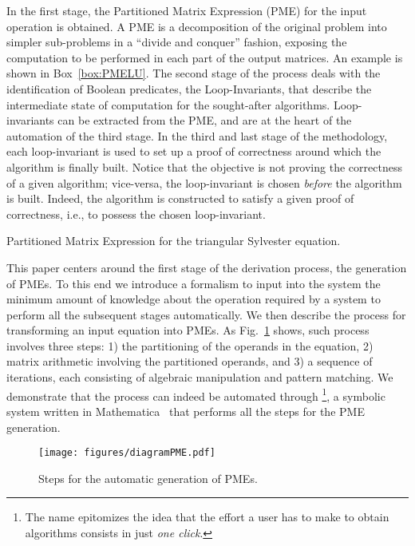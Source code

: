 \documentclass{llncs}
\newcommand{\click}{{\sc{Cl\makebox[.58\width][c]{1}ck}}}
\begin{document}
In the first stage, the Partitioned Matrix Expression (PME) for the input 
operation is obtained. A PME is a decomposition of the original problem 
into simpler sub-problems in a ``divide and conquer'' fashion, exposing the
computation to be performed in each part of the output matrices. 
An example is shown in Box~\ref{box:PMELU}. The second 
stage of the process deals with the identification of Boolean predicates, 
the Loop-Invariants, that describe the intermediate state of computation 
for the sought-after algorithms. Loop-invariants can be extracted from the 
PME, and are at the heart of the automation of the third stage. In the third 
and last stage of the methodology, each loop-invariant is used to set up
a proof of correctness around which the algorithm is finally built.
Notice that the objective is not proving the correctness of a given
algorithm; vice-versa, the loop-invariant is chosen {\em before} the
algorithm is built. Indeed, the algorithm is constructed to 
satisfy a given proof of correctness, i.e., to possess the chosen 
loop-invariant.

\begin{mybox}
\vspace{2mm}
  \centering
	 \vspace{1mm}
	\caption{Partitioned Matrix Expression for the triangular Sylvester equation.} \label{box:PMELU}
\end{mybox}

This paper centers around the first stage of the derivation process, the generation of PMEs.
To this end we introduce a formalism to input into the
system the minimum amount of knowledge about the operation required by a system to 
perform all the subsequent stages automatically.
We then describe the process for transforming an input equation into PMEs.
As Fig.~\ref{fig:stepsPME} shows, such process involves three steps: 
1) the partitioning of the operands in the equation, 
2) matrix arithmetic involving the partitioned operands, and
3) a sequence of iterations, each consisting of algebraic manipulation and
pattern matching.
We demonstrate that the process can indeed be automated through
\click{}\footnote{The name \click{} epitomizes the idea 
that the effort a user has to make to obtain algorithms consists in just {\it one click}.}, 
a symbolic system written in Mathematica~\cite{MathematicaOnline} 
that performs all the steps for the PME generation.

\begin{figure}[t]
  \centering
  \texttt{[image: figures/diagramPME.pdf]}
  \caption{Steps for the automatic generation of PMEs.} \label{fig:stepsPME}
\end{figure}
\end{document}
